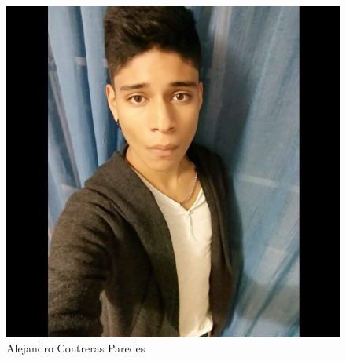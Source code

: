\documentclass[12pt,twoside]{article}
\begin{document}
\begin{figure}[h]
	\centering
	\begin{minipage}[t]{10cm}
		\centering
		\includegraphics[scale=0.2]{Foto1}
		\caption{Alejandro Contreras Paredes}
	\end{minipage}
	\hspace{18cm}
	\begin{minipage}[t]{10cm}
		\centering

\end{minipage}
\end{figure}
\end{document}
